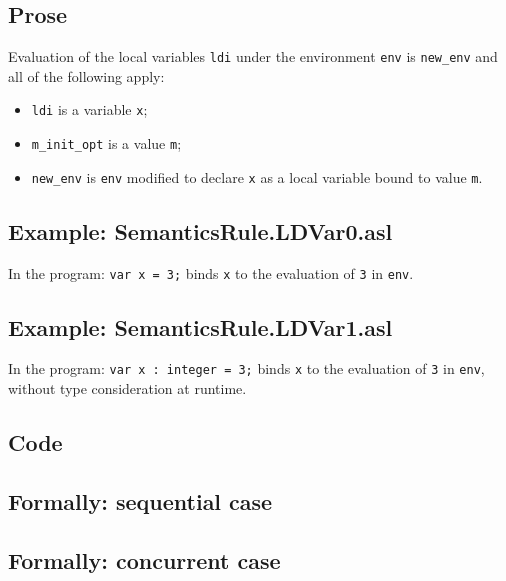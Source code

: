 \documentclass{book}
\begin{document}
    \subsection{Prose}
Evaluation of the local variables \texttt{ldi} under the environment
\texttt{env} is \texttt{new\_env} and all of the following apply:
    \begin{itemize}
    \item \texttt{ldi} is a variable \texttt{x};
    \item \texttt{m\_init\_opt} is a value \texttt{m};
    \item \texttt{new\_env} is \texttt{env} modified to declare \texttt{x} as a
local variable bound to value \texttt{m}.
    \end{itemize}

    \subsection{Example: SemanticsRule.LDVar0.asl}
    In the program:
    \texttt{var x = 3;} binds \texttt{x} to the evaluation of \texttt{3} in \texttt{env}.

    \subsection{Example: SemanticsRule.LDVar1.asl}
    In the program:
    \texttt{var x : integer = 3;} binds \texttt{x} to the evaluation of
\texttt{3} in \texttt{env}, without type consideration at runtime.

  \subsection{Code}

\begin{emptyformal}
  \subsection{Formally: sequential case}

  \subsection{Formally: concurrent case}
\end{emptyformal}
\end{document}

